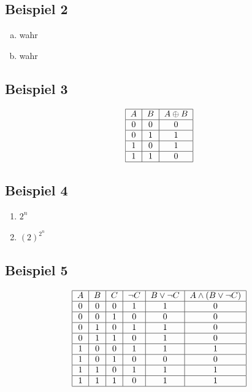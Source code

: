\documentclass[12pt, a4paper, oneside]{article}
\begin{document}
\subsection{Beispiel 2}
\begin{enumerate}[(a)]
  \item wahr
  \item wahr
\end{enumerate}

\subsection{Beispiel 3}
\begin{equation}
  \begin{tabular}{| c | c | c |}
    \hline
    $A$ & $B$ & $A \oplus B$ \\ \hline
    0 & 0 & 0 \\ \hline
    0 & 1 & 1 \\ \hline
    1 & 0 & 1 \\ \hline
    1 & 1 & 0 \\ \hline
  \end{tabular}
\end{equation}

\subsection{Beispiel 4}
\begin{enumerate}
  \item $2^{n}$
  \item $(2)^{2^{n}}$
\end{enumerate}

\subsection{Beispiel 5}
\begin{equation}
  \begin{tabular}{| c | c | c | c | c | c |}
    \hline
    $A$ & $B$ & $C$ & $\lnot C$ & $B \lor \lnot C$ & $A \land (B \lor \lnot C)$ \\ \hline
    0 & 0 & 0 & 1 & 1 & 0 \\ \hline
    0 & 0 & 1 & 0 & 0 & 0 \\ \hline
    0 & 1 & 0 & 1 & 1 & 0 \\ \hline
    0 & 1 & 1 & 0 & 1 & 0 \\ \hline
    1 & 0 & 0 & 1 & 1 & 1 \\ \hline
    1 & 0 & 1 & 0 & 0 & 0 \\ \hline
    1 & 1 & 0 & 1 & 1 & 1 \\ \hline
    1 & 1 & 1 & 0 & 1 & 1 \\ \hline
  \end{tabular}
\end{equation}
\end{document}
